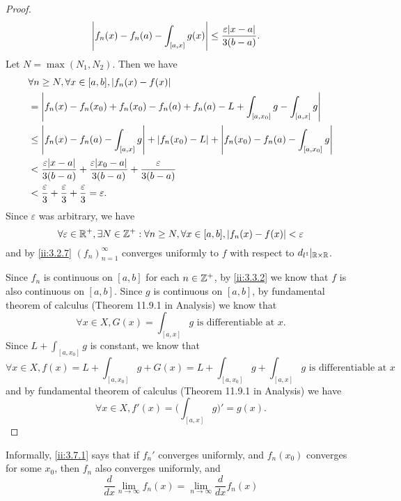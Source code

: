 \begin{proof}
\begin{align*}
             & \abs{f_n(x) - f_n(a) - \int_{[a, x]} g(x)} \leq \dfrac{\varepsilon \abs{x - a}}{3(b - a)}.
  \end{align*}
  Let \(N = \max(N_1, N_2)\).
  Then we have
  \begin{align*}
     & \forall n \geq N, \forall x \in [a, b], \abs{f_n(x) - f(x)}                                                               \\
     & = \abs{f_n(x) - f_n(x_0) + f_n(x_0) - f_n(a) + f_n(a) - L + \int_{[a, x_0]} g - \int_{[a, x]} g}                          \\
     & \leq \abs{f_n(x) - f_n(a) - \int_{[a, x]} g} + \abs{f_n(x_0) - L} + \abs{f_n(x_0) - f_n(a) - \int_{[a, x_0]} g}           \\
     & < \dfrac{\varepsilon \abs{x - a}}{3(b - a)} + \dfrac{\varepsilon \abs{x_0 - a}}{3(b - a)} + \dfrac{\varepsilon}{3(b - a)} \\
     & < \dfrac{\varepsilon}{3} + \dfrac{\varepsilon}{3} + \dfrac{\varepsilon}{3} = \varepsilon.
  \end{align*}
  Since \(\varepsilon\) was arbitrary, we have
  \[
    \forall \varepsilon \in \mathbb{R}^+, \exists N \in \mathbb{Z}^+ : \forall n \geq N, \forall x \in [a, b], \left\lvert f_n(x) - f(x)\right\rvert < \varepsilon
  \]
  and by \cref{ii:3.2.7} \((f_n)_{n = 1}^\infty\) converges uniformly to \(f\) with respect to \(d_{l^1}|_{\mathbb{R} \times \mathbb{R}}\).

  Since \(f_n\) is continuous on \([a, b]\) for each \(n \in \mathbb{Z}^+\), by \cref{ii:3.3.2} we know that \(f\) is also continuous on \([a, b]\).
  Since \(g\) is continuous on \([a, b]\), by fundamental theorem of calculus (Theorem 11.9.1 in Analysis) we know that
  \[
    \forall x \in X, G(x) = \int_{[a, x]} g \text{ is differentiable at } x.
  \]
  Since \(L + \int_{[a, x_0]} g\) is constant, we know that
  \[
    \forall x \in X, f(x) = L + \int_{[a, x_0]} g + G(x) = L + \int_{[a, x_0]} g + \int_{[a, x]} g \text{ is differentiable at } x
  \]
  and by fundamental theorem of calculus (Theorem 11.9.1 in Analysis) we have
  \[
    \forall x \in X, f'(x) = \bigg(\int_{[a, x]} g\bigg)' = g(x).
  \]
\end{proof}

\begin{note}
  Informally, \cref{ii:3.7.1} says that if \(f_n'\) converges uniformly, and \(f_n(x_0)\) converges for some \(x_0\), then \(f_n\) also converges uniformly, and
  \[
    \dfrac{d}{dx} \lim_{n \to \infty} f_n(x) = \lim_{n \to \infty} \dfrac{d}{dx} f_n(x)
  \]
\end{note}

